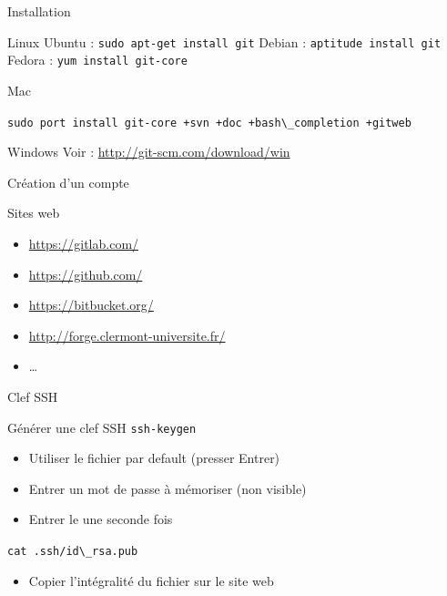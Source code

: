 \documentclass{beamer}
\begin{document}
\begin{frame}{Installation}

  \begin{block}{Linux}
    Ubuntu : \textcolor{commandcolor}{\verb?sudo apt-get install git?}\linebreak
    Debian : \textcolor{commandcolor}{\verb?aptitude install git?}\linebreak
    Fedora : \textcolor{commandcolor}{\verb?yum install git-core?}
  \end{block}

  \begin{block}{Mac}
    \begin{scriptsize}
      \textcolor{commandcolor}{\verb?sudo port install git-core +svn +doc +bash\_completion +gitweb?}
    \end{scriptsize}
  \end{block}

  \begin{block}{Windows}
    Voir : \url{http://git-scm.com/download/win}
  \end{block}

\end{frame}

\begin{frame}{Création d'un compte}

  \begin{block}{Sites web}
    \begin{itemize}
    \item \url{https://gitlab.com/}
    \item \url{https://github.com/}
    \item \url{https://bitbucket.org/}
    \item \url{http://forge.clermont-universite.fr/}
    \item \dots
    \end{itemize}
  \end{block}


\end{frame}


\begin{frame}{Clef SSH}

  \begin{exampleblock}{Générer une clef SSH}
    \textcolor{commandcolor}{\verb?ssh-keygen?}
    \begin{itemize}
    \item Utiliser le fichier par default (presser Entrer)
    \item Entrer un mot de passe à mémoriser (non visible)
    \item Entrer le une seconde fois
    \end{itemize}
    \textcolor{commandcolor}{\verb?cat .ssh/id\_rsa.pub ?}
    \begin{itemize}
    \item Copier l'intégralité du fichier sur le site web
    \end{itemize}
  \end{exampleblock}

\end{frame}
\end{document}
